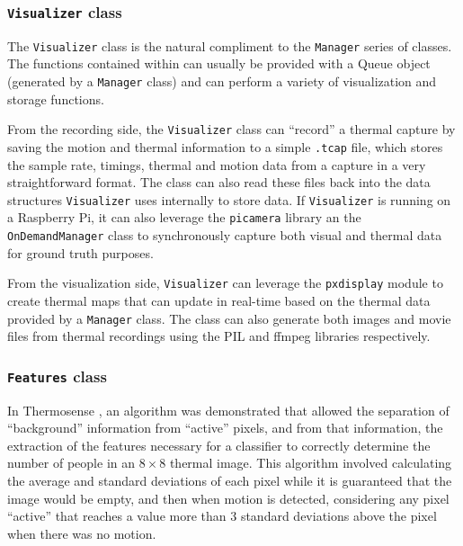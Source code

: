 \documentclass[../thesis/thesis.tex]{subfiles}
\begin{document}
\subsubsection*{\texttt{Visualizer} class}
The \texttt{Visualizer} class is the natural compliment to the \texttt{Manager} series of classes. The functions contained within can usually be provided with a Queue object (generated by a \texttt{Manager} class) and can perform a variety of visualization and storage functions.

From the recording side, the \texttt{Visualizer} class can ``record'' a thermal capture by saving the motion and thermal information to a simple \texttt{.tcap} file, which stores the sample rate, timings, thermal and motion data from a capture in a very straightforward format. The class can also read these files back into the data structures \texttt{Visualizer} uses internally to store data. If \texttt{Visualizer} is running on a Raspberry Pi, it can also leverage the \texttt{picamera} library an the \texttt{OnDemandManager} class to synchronously capture both visual and thermal data for ground truth purposes.

From the visualization side, \texttt{Visualizer} can leverage the \texttt{pxdisplay} module to create thermal maps that can update in real-time based on the thermal data provided by a \texttt{Manager} class. The class can also generate both images and movie files from thermal recordings using the PIL and ffmpeg libraries respectively.

\subsubsection*{\texttt{Features} class}

In Thermosense \cite{beltran2013thermosense}, an algorithm was demonstrated that allowed the separation of ``background'' information from ``active'' pixels, and from that information, the extraction of the features necessary for a classifier to correctly determine the number of people in an $8\times8$ thermal image. This algorithm involved calculating the average and standard deviations of each pixel while it is guaranteed that the image would be empty, and then when motion is detected, considering any pixel ``active'' that reaches a value more than 3 standard deviations above the pixel when there was no motion.
\end{document}
